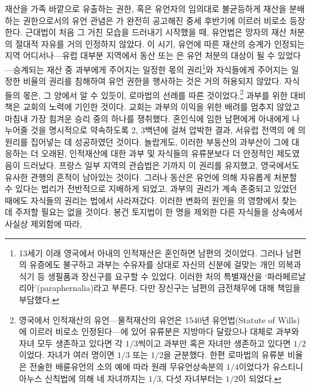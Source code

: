 재산을 가족 바깥으로 유출하는 권한,
혹은
유언자의 임의대로
불균등하게 재산을 분배하는 권한으로서의 유언 관념은
가 완전히 공고해진 중세 후반기에 이르러 비로소 등장한다.
근대법이 처음 그 거친 모습을 드러내기 시작했을 때,
유언법은 망자의 재산 처분의 절대적 자유를 거의 인정하지 않았다.
이 시기, 유언에 따른 재산의 승계가 인정되는 지역 어디서나---유럽
대부분 지역에서 동산 또는 은 유언 처분의 대상이 될 수
있었다---승계되는 재산 중 과부에게 주어지는 일정한 몫의 권리\footnote{%
  13세기 이래 영국에서 아내의 인적재산은 혼인하면 남편의 것이었다. 그러나
  남편의 유증에도 불구하고 과부는 수유자를 상대로
  자신의 신분에 걸맞는 개인 의복과 식기 등 생필품과 장신구를
  요구할 수 있었다.
  이러한 처의 특별재산을 `파라페르날리아'(paraphernalia)라고 부른다.
  다만 장신구는 남편의 금전채무에 대해 책임을 부담했다.
}와
자식들에게 주어지는 일정한 비율의 권리를
침해하여 유언 권한을 행사하는 것은 거의 허용되지 않았다.
자식들의 몫은, 그 양에서 알 수 있듯이,
로마법의 선례를 따른 것이었다.\footnote{%
  영국에서 인적재산의 유언---물적재산의 유언은
  1540년 유언법(Statute of Wills)에 이르러 비로소 인정된다---에 있어
  유류분은 지방마다 달랐으나 대체로
  과부와 자녀 모두 생존하고 있다면 각 $1/3$씩이고
  과부만 혹은 자녀만 생존하고 있다면 $1/2$이었다.
  자녀가 여러 명이면 $1/3$ 또는 $1/2$을 균분했다.
  한편 로마법의 유류분 비율은
  전술한 배륜유언의 소의 예에 따라
  원래 무유언상속분의 $1/4$이었다가
  유스티니아누스 신칙법에 의해 네 자녀까지는 $1/3$,
  다섯 자녀부터는 $1/2$이 되었다.
}
과부를 위한 대비책은 교회의 노력에 기인한 것이다.
교회는 과부의 이익을 위한 배려를 멈추지 않았고
마침내 가장 힘겨운 승리 중의 하나를 쟁취했다.
혼인식에 임한
남편에게
아내에게 나누어줄 것을 명시적으로 약속하도록
2, 3백년에 걸쳐
압박한 결과,
서유럽 전역의 에 의 원리를
집어넣는 데 성공하였던 것이다.
놀랍게도, 이러한 부동산의 과부산이
그에 대응하는 더 오래된,
인적재산에 대한 과부 및 자식들의 유류분보다
더 안정적인 제도였음이 드러났다.
프랑스 일부 지역의 관습법은 기까지 이 권리를 유지했고,
영국에서도 유사한 관행의 흔적이 남아있는 것이다.
그러나
동산은 유언에 의해 자유롭게 처분할 수 있다는 법리가
전반적으로 지배하게 되었고,
과부의 권리가 계속 존중되고 있었던 때에도
자식들의 권리는 법에서 사라져갔다.
이러한 변화의 원인을 의 영향에서
찾는 데 주저할 필요는 없을 것이다.
봉건 토지법이 한 명을 제외한 다른 자식들을 상속에서 사실상 제외함에 따라,
